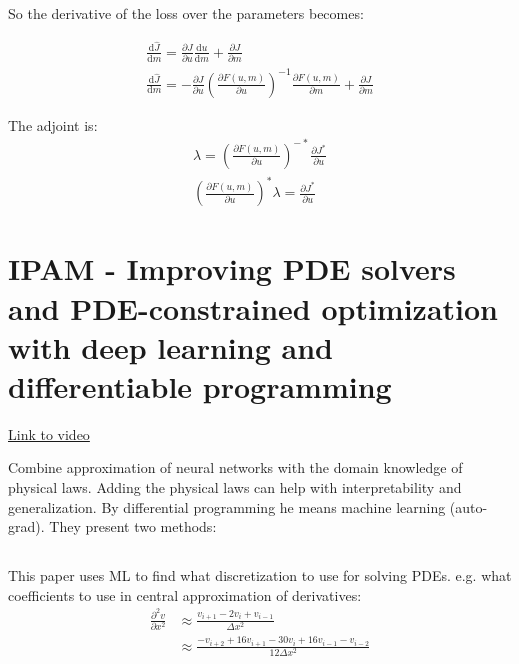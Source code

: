 \documentclass{article}
\newcommand{\citeall}[1]{\citeauthor{#1}}
\begin{document}
So the derivative of the loss over the parameters becomes:

\begin{equation}
\begin{array}{l}\frac{\mathrm{d} \widehat{J}}{\mathrm{d} m}=\frac{\partial J}{\partial u} \frac{\mathrm{d} u}{\mathrm{d} m}+\frac{\partial J}{\partial m} \\ \frac{\mathrm{d} \widehat{J}}{\mathrm{d} m}=-\frac{\partial J}{\partial u}\left(\frac{\partial F(u, m)}{\partial u}\right)^{-1} \frac{\partial F(u, m)}{\partial m}+\frac{\partial J}{\partial m}\end{array}
\end{equation}

The adjoint is: 
\begin{equation}
\begin{array}{l}\lambda=\left(\frac{\partial F(u, m)}{\partial u}\right)^{-*} \frac{\partial J^{*}}{\partial u} \\ \left(\frac{\partial F(u, m)}{\partial u}\right)^{*} \lambda=\frac{\partial J^{*}}{\partial u}\end{array}
\end{equation}


\section{IPAM - Improving PDE solvers and PDE-constrained optimization with deep learning and differentiable programming}

\href{http://www.ipam.ucla.edu/abstract/?tid=16344&pcode=MLPWS2}{Link to video}

Combine approximation of neural networks with the domain knowledge of physical laws. Adding the physical laws can help with interpretability and generalization. By differential programming he means machine learning (auto-grad). They present two methods:

\subsection{\citeall{Bar-Sinai2019LearningEquations}}

This paper uses ML to find what discretization to use for solving PDEs. e.g. what coefficients to use in central approximation of derivatives:
$$
\begin{aligned} \frac{\partial^{2} v}{\partial x^{2}} & \approx \frac{v_{i+1}-2 v_{i}+v_{i-1}}{\Delta x^{2}} \\ & \approx \frac{-v_{i+2}+16 v_{i+1}-30 v_{i}+16 v_{i-1}-v_{i-2}}{12 \Delta x^{2}} \end{aligned}
$$
\end{document}
